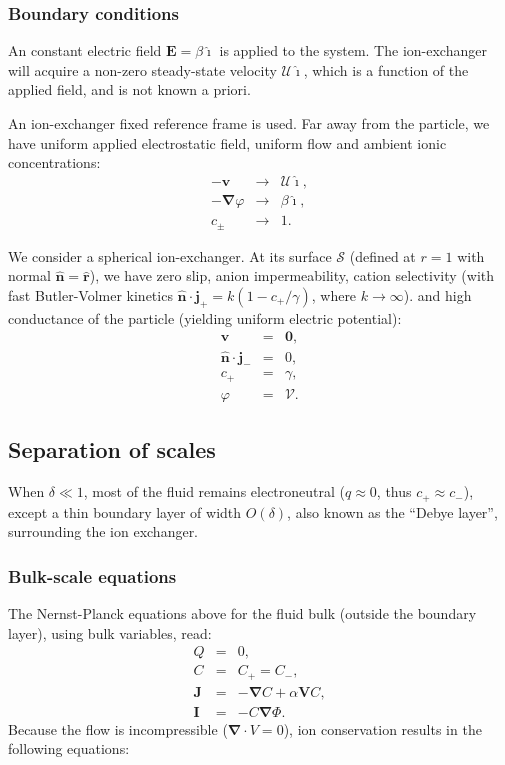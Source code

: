 \documentclass[final]{elsarticle}
\newcommand\bnabla{\boldsymbol{\nabla}}
\newcommand\bv{\boldsymbol{v}}
\newcommand\bV{\boldsymbol{V}}
\newcommand\bE{\boldsymbol{E}}
\newcommand\bn{\boldsymbol{\hat{n}}}
\newcommand\bj{\boldsymbol{j}}
\newcommand\bI{\boldsymbol{I}}
\newcommand\bJ{\boldsymbol{J}}
\newcommand\br{\boldsymbol{r}}
\newcommand\brhat{\hat{\br}}
\newcommand\bzero{\boldsymbol{0}}
\newcommand\cU{\mathscr{U}}
\newcommand\cV{\mathscr{V}}
\newcommand\ui{\boldsymbol{\hat{\imath}}}
\begin{document}
\subsubsection{Boundary conditions}
An constant electric field $\bE = \beta \ui$ is applied to the system.
The ion-exchanger will acquire a non-zero steady-state velocity $\cU \ui$, which is
a function of the applied field, and is not known a priori.

An ion-exchanger fixed reference frame is used.
Far away from the particle, we have uniform applied electrostatic field, uniform flow
and ambient ionic concentrations:
\begin{eqnarray*}
-\bv &\rightarrow& \cU \ui, \\
-\bnabla \varphi &\rightarrow& \beta\ui, \\
c_\pm &\rightarrow& 1.
\end{eqnarray*}

We consider a spherical ion-exchanger. 
At its surface $\mathcal{S}$ (defined at $r=1$ with normal $\bn = \brhat$), 
we have zero slip, anion impermeability, cation selectivity 
(with fast Butler-Volmer\cite{bard2000book} kinetics
$\bn \cdot \bj_+ = k (1 - c_+/\gamma)$, where $k \rightarrow \infty$).
and high conductance of the particle (yielding uniform electric potential):
\begin{eqnarray*}
\bv & = & \bzero, \\
\bn \cdot \bj_- & = & 0, \\
c_+ &=& \gamma, \\
\varphi & = & \cV.
\end{eqnarray*}

\subsection{Separation of scales}
When $\delta \ll 1$, 
most of the fluid remains electroneutral ($q \approx 0$, thus $c_+ \approx c_-$), 
except a thin boundary layer of width $O(\delta)$, 
also known as the ``Debye layer'', surrounding the ion exchanger. 

\subsubsection  {Bulk-scale equations}
The Nernst-Planck equations above for the fluid bulk (outside
the boundary layer), using bulk variables, read:
\begin{eqnarray*}
  Q & = & 0, \\
  C & = & C_+ = C_-, \\
\bJ &=& -\bnabla C + \alpha \bV C, \\
\bI &=& -C \bnabla \varPhi.
\end{eqnarray*}
Because the flow is incompressible ($\bnabla \cdot V = 0$), 
ion conservation results in the following equations:
\end{document}
